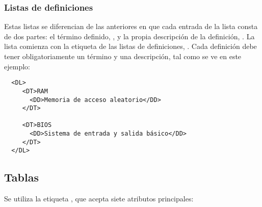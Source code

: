 \subsubsection*{Listas de definiciones}

Estas listas se  diferencian de las anteriores en que  cada entrada de
la lista  consta de dos partes:  el término definido, ,  y la
propia descripción de la definición,  . La lista comienza con
la etiqueta de las listas  de definiciones, . Cada definición
debe tener obligatoriamente un término  y una descripción, tal como se
ve en este ejemplo:

\begin{verbatim}
  <DL>
     <DT>RAM
       <DD>Memoria de acceso aleatorio</DD>
     </DT>

     <DT>BIOS
       <DD>Sistema de entrada y salida básico</DD>
     </DT>
  </DL>
\end{verbatim}

\subsection{Tablas}

Se  utiliza  la  etiqueta  , que  acepta  siete  atributos
principales:

